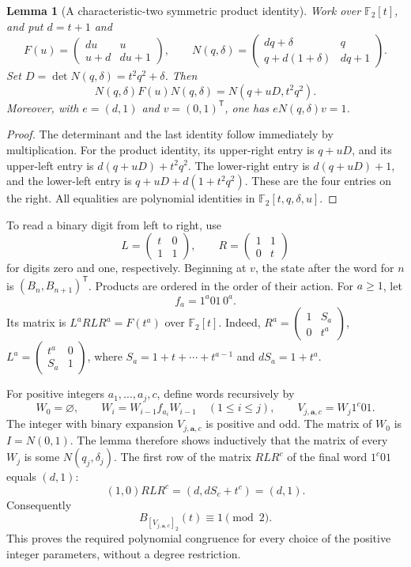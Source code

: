 \documentclass[11pt,a4paper]{article}
\newtheorem{lemma}[theorem]{Lemma}
\theoremstyle{definition}
\theoremstyle{remark}
\begin{document}
\begin{lemma}[A characteristic-two symmetric product identity]
Work over $\mathbb F_2[t]$, and put $d=t+1$ and
\[
 F(u)=\begin{pmatrix}du&u\\u+d&du+1\end{pmatrix},\qquad
 N(q,\delta)=\begin{pmatrix}dq+\delta&q\\q+d(1+\delta)&dq+1\end{pmatrix}.
\]
Set $D=\det N(q,\delta)=t^2q^2+\delta$. Then
\[
 N(q,\delta)F(u)N(q,\delta)
   =N(q+uD,t^2q^2).
\]
Moreover, with $e=(d,1)$ and $v=(0,1)^{\mathsf T}$, one has
$eN(q,\delta)v=1$.
\end{lemma}
\begin{proof}
The determinant and the last identity follow immediately by multiplication.
For the product identity, its upper-right entry is $q+uD$, and its
upper-left entry is $d(q+uD)+t^2q^2$. The lower-right entry is
$d(q+uD)+1$, and the lower-left entry is
$q+uD+d(1+t^2q^2)$. These are the four entries on the right.
All equalities are polynomial identities in $\mathbb F_2[t,q,\delta,u]$.
\end{proof}

To read a binary digit from left to right, use
\[
 L=\begin{pmatrix}t&0\\1&1\end{pmatrix},\qquad
 R=\begin{pmatrix}1&1\\0&t\end{pmatrix}
\]
for digits zero and one, respectively. Beginning at $v$, the state after
the word for $n$ is $(B_n,B_{n+1})^{\mathsf T}$. Products are ordered in
the order of their action. For $a\ge1$, let
\[
 f_a=1^a01\,0^a.
\]
Its matrix is $L^aRLR^a=F(t^a)$ over $\mathbb F_2[t]$.
Indeed, $R^a=\left(\begin{smallmatrix}1&S_a\\0&t^a\end{smallmatrix}\right)$,
$L^a=\left(\begin{smallmatrix}t^a&0\\S_a&1\end{smallmatrix}\right)$,
where $S_a=1+t+\cdots+t^{a-1}$ and $dS_a=1+t^a$.

For positive integers $a_1,\ldots,a_j,c$, define words recursively by
\[
 W_0=\varnothing,\qquad W_i=W_{i-1}f_{a_i}W_{i-1}
 \quad(1\le i\le j),\qquad V_{j,\mathbf a,c}=W_j1^c01.
\]
The integer with binary expansion $V_{j,\mathbf a,c}$ is positive and odd.
The matrix of $W_0$ is $I=N(0,1)$. The lemma therefore shows inductively
that the matrix of every $W_j$ is some $N(q_j,\delta_j)$. The first row
of the matrix $RLR^c$ of the final word $1^c01$ equals $(d,1)$:
\[
 (1,0)RLR^c=(d,dS_c+t^c)=(d,1).
\]
Consequently
\[
 B_{[V_{j,\mathbf a,c}]_2}(t)\equiv1\pmod2.
\]
This proves the required polynomial congruence for every choice of the
positive integer parameters, without a degree restriction.
\end{document}
